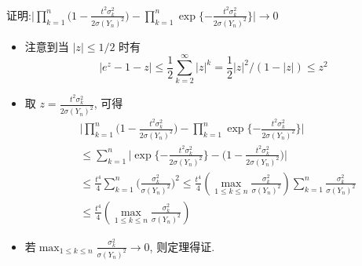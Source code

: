 \begin{frame}{证明:$\big|\prod_{k=1}^{n}\big(1-\frac{t^{2} \sigma_{k}^{2}}{2 \sigma(Y_n)^2}\big)-\prod_{k=1}^{n} \exp\{-\frac{t^2\sigma_k^2}{2\sigma(Y_n)^2}\}\big| \rightarrow 0$}
\vspace{-0.1cm}
\begin{itemize}

	\item 注意到当 $|z| \leq 1 / 2$ 时有
	{\small \[
	\left|e^{z}-1-z\right| \leq \frac{1}{2} \sum_{k=2}^{\infty}|z|^{k}=\frac{1}{2}|z|^{2} /(1-|z|) \leq z^{2}
	\]}
    \item 取 $z=\frac{t^{2} \sigma_{k}^{2}}{2 \sigma(Y_n)^2}$, 可得
    {\small \begin{align*}
		&\big|\prod_{k=1}^{n}\big(1-\frac{t^{2} \sigma_{k}^{2}}{2 \sigma(Y_n)^2}\big)-\prod_{k=1}^{n} \exp\{-\frac{t^2\sigma_k^2}{2\sigma(Y_n)^2}\}\big|\\
		&\leq \sum_{k=1}^{n}\big|\exp\{-\frac{t^2\sigma_k^2}{2\sigma(Y_n)^2}\}-\big(1-\frac{t^{2} \sigma_{k}^{2}}{2 \sigma(Y_n)^2}\big)\big|\\
		&\leq \frac{t^4}{4}\sum_{k=1}^{n}\big(\frac{\sigma_{k}^{2}}{\sigma(Y_n)^2}\big)^2\leq \frac{t^{4}}{4}\left(\max _{1 \leq k \leq n} \frac{\sigma_{k}^{2}}{\sigma(Y_n)^2}\right) \sum_{k=1}^{n} \frac{\sigma_{k}^{2}}{\sigma(Y_n)^2}\\
		&\leq \frac{t^{4}}{4}\left(\max _{1 \leq k \leq n} \frac{\sigma_{k}^{2}}{\sigma(Y_n)^2}\right)
	\end{align*}}
	\item 若$\max _{1 \leq k \leq n} \frac{\sigma_{k}^{2}}{\sigma(Y_n)^2}\rightarrow 0$, 则定理得证.
\end{itemize}

\end{frame}


